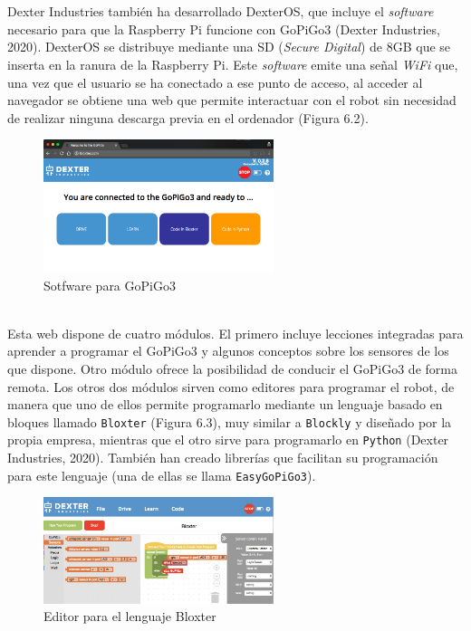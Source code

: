 \documentclass{report}
\begin{document}
\\
\\
Dexter Industries también ha desarrollado DexterOS, que incluye el \textit{software} necesario para que la Raspberry Pi funcione con GoPiGo3 (Dexter Industries, 2020). DexterOS se distribuye mediante una SD (\textit{Secure Digital}) de 8GB que se inserta en la ranura de la Raspberry Pi. Este \textit{software} emite una señal \textit{WiFi} que, una vez que el usuario se ha conectado a ese punto de acceso, al acceder al navegador se obtiene una web que permite interactuar con el robot sin necesidad de realizar ninguna descarga previa en el ordenador (Figura 6.2).
\\
\begin{figure}[h!]
  \centering
    \includegraphics[width=0.6\textwidth]{images/software_GoPiGo.png}
  \caption{Sotfware para GoPiGo3}
  \label{Sotfware para GoPiGo3}
\end{figure}
\\
Esta web dispone de cuatro módulos. El primero incluye lecciones integradas para aprender a programar el GoPiGo3 y algunos conceptos sobre los sensores de los que dispone. Otro módulo ofrece la posibilidad de conducir el GoPiGo3 de forma remota. Los otros dos módulos sirven como editores para programar el robot, de manera que uno de ellos permite programarlo mediante un lenguaje basado en bloques llamado \texttt{Bloxter} (Figura 6.3), muy similar a \texttt{Blockly} y diseñado por la propia empresa, mientras que el otro sirve para programarlo en \texttt{Python} (Dexter Industries, 2020). También han creado librerías que facilitan su programación para este lenguaje (una de ellas se llama \texttt{EasyGoPiGo3}).
\\
\begin{figure}[h!]
  \centering
    \includegraphics[width=0.6\textwidth]{images/editor_bloxter.png}
  \caption{Editor para el lenguaje Bloxter}
  \label{Editor para el lenguaje Bloxter}
\end{figure}
\end{document}

